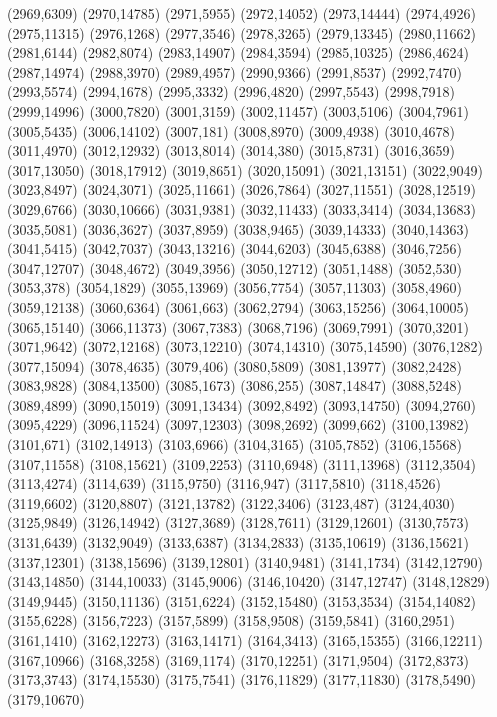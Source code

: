 (2969,6309)
(2970,14785)
(2971,5955)
(2972,14052)
(2973,14444)
(2974,4926)
(2975,11315)
(2976,1268)
(2977,3546)
(2978,3265)
(2979,13345)
(2980,11662)
(2981,6144)
(2982,8074)
(2983,14907)
(2984,3594)
(2985,10325)
(2986,4624)
(2987,14974)
(2988,3970)
(2989,4957)
(2990,9366)
(2991,8537)
(2992,7470)
(2993,5574)
(2994,1678)
(2995,3332)
(2996,4820)
(2997,5543)
(2998,7918)
(2999,14996)
(3000,7820)
(3001,3159)
(3002,11457)
(3003,5106)
(3004,7961)
(3005,5435)
(3006,14102)
(3007,181)
(3008,8970)
(3009,4938)
(3010,4678)
(3011,4970)
(3012,12932)
(3013,8014)
(3014,380)
(3015,8731)
(3016,3659)
(3017,13050)
(3018,17912)
(3019,8651)
(3020,15091)
(3021,13151)
(3022,9049)
(3023,8497)
(3024,3071)
(3025,11661)
(3026,7864)
(3027,11551)
(3028,12519)
(3029,6766)
(3030,10666)
(3031,9381)
(3032,11433)
(3033,3414)
(3034,13683)
(3035,5081)
(3036,3627)
(3037,8959)
(3038,9465)
(3039,14333)
(3040,14363)
(3041,5415)
(3042,7037)
(3043,13216)
(3044,6203)
(3045,6388)
(3046,7256)
(3047,12707)
(3048,4672)
(3049,3956)
(3050,12712)
(3051,1488)
(3052,530)
(3053,378)
(3054,1829)
(3055,13969)
(3056,7754)
(3057,11303)
(3058,4960)
(3059,12138)
(3060,6364)
(3061,663)
(3062,2794)
(3063,15256)
(3064,10005)
(3065,15140)
(3066,11373)
(3067,7383)
(3068,7196)
(3069,7991)
(3070,3201)
(3071,9642)
(3072,12168)
(3073,12210)
(3074,14310)
(3075,14590)
(3076,1282)
(3077,15094)
(3078,4635)
(3079,406)
(3080,5809)
(3081,13977)
(3082,2428)
(3083,9828)
(3084,13500)
(3085,1673)
(3086,255)
(3087,14847)
(3088,5248)
(3089,4899)
(3090,15019)
(3091,13434)
(3092,8492)
(3093,14750)
(3094,2760)
(3095,4229)
(3096,11524)
(3097,12303)
(3098,2692)
(3099,662)
(3100,13982)
(3101,671)
(3102,14913)
(3103,6966)
(3104,3165)
(3105,7852)
(3106,15568)
(3107,11558)
(3108,15621)
(3109,2253)
(3110,6948)
(3111,13968)
(3112,3504)
(3113,4274)
(3114,639)
(3115,9750)
(3116,947)
(3117,5810)
(3118,4526)
(3119,6602)
(3120,8807)
(3121,13782)
(3122,3406)
(3123,487)
(3124,4030)
(3125,9849)
(3126,14942)
(3127,3689)
(3128,7611)
(3129,12601)
(3130,7573)
(3131,6439)
(3132,9049)
(3133,6387)
(3134,2833)
(3135,10619)
(3136,15621)
(3137,12301)
(3138,15696)
(3139,12801)
(3140,9481)
(3141,1734)
(3142,12790)
(3143,14850)
(3144,10033)
(3145,9006)
(3146,10420)
(3147,12747)
(3148,12829)
(3149,9445)
(3150,11136)
(3151,6224)
(3152,15480)
(3153,3534)
(3154,14082)
(3155,6228)
(3156,7223)
(3157,5899)
(3158,9508)
(3159,5841)
(3160,2951)
(3161,1410)
(3162,12273)
(3163,14171)
(3164,3413)
(3165,15355)
(3166,12211)
(3167,10966)
(3168,3258)
(3169,1174)
(3170,12251)
(3171,9504)
(3172,8373)
(3173,3743)
(3174,15530)
(3175,7541)
(3176,11829)
(3177,11830)
(3178,5490)
(3179,10670)
